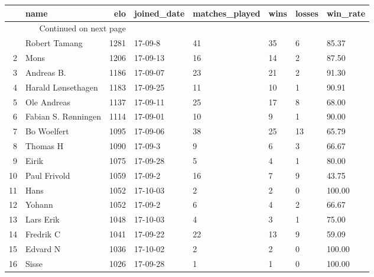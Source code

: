 \begin{longtable}{|r|l|r|l|l|l|l|l|}
\toprule
{} &                 name &   elo & joined\_date &  matches\_played &  wins &  losses &  win\_rate \\
\midrule
\endhead
\midrule
\multicolumn{3}{r}{{Continued on next page}} \\
\midrule
\endfoot

\bottomrule
\endlastfoot
1  &        Robert Tamang &  1281 &     17-09-8 &              41 &    35 &       6 &     85.37 \\
2  &                 Mons &  1206 &    17-09-13 &              16 &    14 &       2 &     87.50 \\
3  &           Andreas B. &  1186 &    17-09-07 &              23 &    21 &       2 &     91.30 \\
4  &   Harald Lønsethagen &  1183 &    17-09-25 &              11 &    10 &       1 &     90.91 \\
5  &          Ole Andreas &  1137 &    17-09-11 &              25 &    17 &       8 &     68.00 \\
6  &  Fabian S. Rønningen &  1114 &    17-09-01 &              10 &     9 &       1 &     90.00 \\
7  &          Bo Woelfert &  1095 &    17-09-06 &              38 &    25 &      13 &     65.79 \\
8  &             Thomas H &  1090 &     17-09-3 &               9 &     6 &       3 &     66.67 \\
9  &                Eirik &  1075 &    17-09-28 &               5 &     4 &       1 &     80.00 \\
10 &         Paul Frivold &  1059 &     17-09-2 &              16 &     7 &       9 &     43.75 \\
11 &                 Hans &  1052 &    17-10-03 &               2 &     2 &       0 &    100.00 \\
12 &               Yohann &  1052 &     17-09-2 &               6 &     4 &       2 &     66.67 \\
13 &            Lars Erik &  1048 &    17-10-03 &               4 &     3 &       1 &     75.00 \\
14 &            Fredrik C &  1041 &    17-09-22 &              22 &    13 &       9 &     59.09 \\
15 &             Edvard N &  1036 &    17-10-02 &               2 &     2 &       0 &    100.00 \\
16 &                Sisse &  1026 &    17-09-28 &               1 &     1 &       0 &    100.00 \\

\end{longtable}
